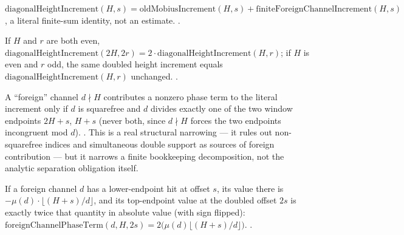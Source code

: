 \begin{prop}
$\mathrm{diagonalHeightIncrement}(H,s) = \mathrm{oldMobiusIncrement}(H,s) +
\mathrm{finiteForeignChannelIncrement}(H,s)$, a literal finite-sum identity,
not an estimate.
\quad {} \quad {} \quad {}.
\end{prop}

\begin{thm}
If $H$ and $r$ are both even, $\mathrm{diagonalHeightIncrement}(2H,2r) =
2\cdot\mathrm{diagonalHeightIncrement}(H,r)$; if $H$ is even and $r$ odd, the
same doubled height increment equals $\mathrm{diagonalHeightIncrement}(H,r)$
unchanged.
\quad {}
\quad {} \quad {} \quad {}.
\end{thm}

\begin{obs}
A ``foreign'' channel $d\nmid H$ contributes a nonzero phase term to the
literal increment only if $d$ is squarefree and $d$ divides exactly one of
the two window endpoints $2H{+}s$, $H{+}s$ (never both, since $d\nmid H$
forces the two endpoints incongruent mod $d$).
\quad {}
\quad {} \quad {} \quad {}.
This is a real structural narrowing --- it rules out non-squarefree indices
and simultaneous double support as sources of foreign contribution --- but
it narrows a finite bookkeeping decomposition, not the analytic separation
obligation itself.
\end{obs}

\begin{prop}
If a foreign channel $d$ has a lower-endpoint hit at offset $s$, its value
there is $-\mu(d)\cdot\lfloor(H{+}s)/d\rfloor$, and its top-endpoint value at
the doubled offset $2s$ is exactly twice that quantity in absolute value
(with sign flipped): $\mathrm{foreignChannelPhaseTerm}(d,H,2s) =
2\bigl(\mu(d)\lfloor(H{+}s)/d\rfloor\bigr)$.
\quad {} \quad {} \quad {}.
\end{prop}

